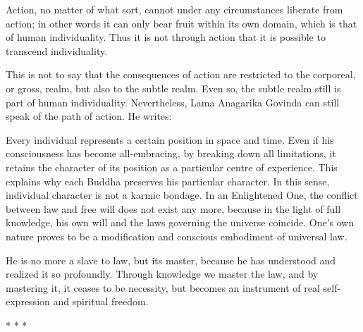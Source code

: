 \begin{quotex}
Action, no matter of what sort, cannot under any circumstances liberate from action; in other words it can only bear fruit within its own domain, which is that of human individuality. Thus it is not through action that it is possible to transcend individuality.

\end{quotex}
This is not to say that the consequences of action are restricted to the corporeal, or gross, realm, but also to the subtle realm. Even so, the subtle realm still is part of human individuality. Nevertheless, Lama Anagarika Govinda can still speak of the path of action. He writes:

\begin{quotex}
Every individual represents a certain position in space and time. Even if his consciousness has become all-embracing, by breaking down all limitations, it retains the character of its position as a particular centre of experience. This explains why each Buddha preserves his particular character. In this sense, individual character is not a karmic bondage. In an Enlightened One, the conflict between law and free will does not exist any more, because in the light of full knowledge, his own will and the laws governing the universe coincide. One's own nature proves to be a modification and conscious embodiment of universal law.

He is no more a slave to law, but its master, because he has understood and realized it so profoundly. Through knowledge we master the law, and by mastering it, it ceases to be necessity, but becomes an instrument of real self-expression and spiritual freedom. 

\end{quotex}


\begin{center}* * *\end{center}

